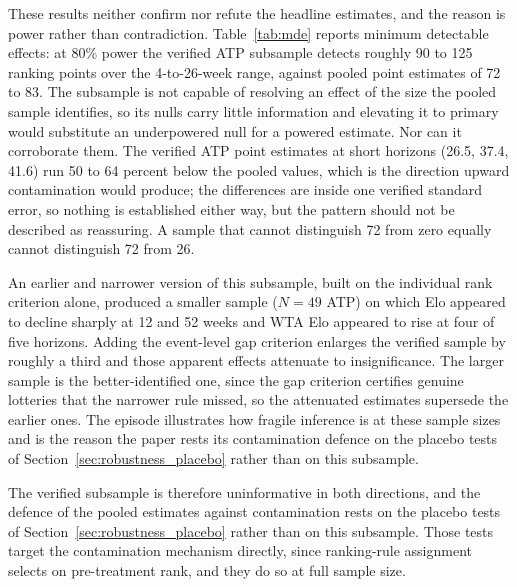 These results neither confirm nor refute the headline estimates, and the reason is power rather than contradiction. Table~\ref{tab:mde} reports minimum detectable effects: at 80\% power the verified ATP subsample detects roughly 90 to 125 ranking points over the 4-to-26-week range, against pooled point estimates of 72 to 83. The subsample is not capable of resolving an effect of the size the pooled sample identifies, so its nulls carry little information and elevating it to primary would substitute an underpowered null for a powered estimate. Nor can it corroborate them. The verified ATP point estimates at short horizons (26.5, 37.4, 41.6) run 50 to 64 percent below the pooled values, which is the direction upward contamination would produce; the differences are inside one verified standard error, so nothing is established either way, but the pattern should not be described as reassuring. A sample that cannot distinguish 72 from zero equally cannot distinguish 72 from 26.

An earlier and narrower version of this subsample, built on the individual rank criterion alone, produced a smaller sample ($N = 49$ ATP) on which Elo appeared to decline sharply at 12 and 52 weeks and WTA Elo appeared to rise at four of five horizons. Adding the event-level gap criterion enlarges the verified sample by roughly a third and those apparent effects attenuate to insignificance. The larger sample is the better-identified one, since the gap criterion certifies genuine lotteries that the narrower rule missed, so the attenuated estimates supersede the earlier ones. The episode illustrates how fragile inference is at these sample sizes and is the reason the paper rests its contamination defence on the placebo tests of Section~\ref{sec:robustness_placebo} rather than on this subsample.

The verified subsample is therefore uninformative in both directions, and the defence of the pooled estimates against contamination rests on the placebo tests of Section~\ref{sec:robustness_placebo} rather than on this subsample. Those tests target the contamination mechanism directly, since ranking-rule assignment selects on pre-treatment rank, and they do so at full sample size.

